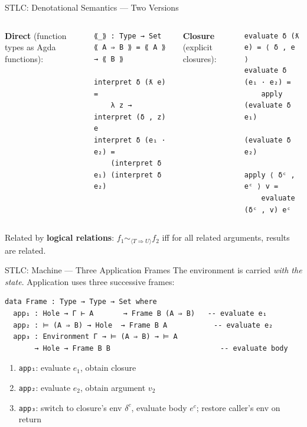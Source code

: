 \documentclass[10pt,compress,aspectratio=169]{beamer}
\begin{document}
\begin{frame}[fragile]{STLC: Denotational Semantics — Two Versions}
  \begin{columns}[T]
      \textbf{Direct} (function types as Agda functions):
\begin{verbatim}
⟪_⟫ : Type → Set
⟪ A ⇒ B ⟫ = ⟪ A ⟫ → ⟪ B ⟫

interpret δ (ƛ e) =
    λ z → interpret (δ , z) e
interpret δ (e₁ · e₂) =
    (interpret δ e₁) (interpret δ e₂)
\end{verbatim}

      \textbf{Closure} (explicit closures):
\begin{verbatim}
evaluate δ (ƛ e) = ⟨ δ , e ⟩
evaluate δ (e₁ · e₂) =
    apply (evaluate δ e₁)
          (evaluate δ e₂)

apply ⟨ δᶜ , eᶜ ⟩ v =
    evaluate (δᶜ , v) eᶜ
\end{verbatim}
  \end{columns}

  \bigskip
  Related by \textbf{logical relations}: $f_1 \sim_{\langle T \Rightarrow U \rangle} f_2$ iff for all related arguments, results are related.
\end{frame}

\begin{frame}[fragile]{STLC: Machine — Three Application Frames}
  The environment is carried \emph{with the state}. Application uses three successive frames:

\begin{verbatim}
data Frame : Type → Type → Set where
  app₁ : Hole → Γ ⊢ A       → Frame B (A ⇒ B)   -- evaluate e₁
  app₂ : ⊨ (A ⇒ B) → Hole  → Frame B A           -- evaluate e₂
  app₃ : Environment Γ → ⊨ (A ⇒ B) → ⊨ A
       → Hole → Frame B B                          -- evaluate body
\end{verbatim}

  \begin{enumerate}
    \item \texttt{app₁}: evaluate $e_1$, obtain closure
    \item \texttt{app₂}: evaluate $e_2$, obtain argument $v_2$
    \item \texttt{app₃}: switch to closure's env $\delta^c$, evaluate body $e^c$; restore caller's env on return
  \end{enumerate}
\end{frame}
\end{document}
